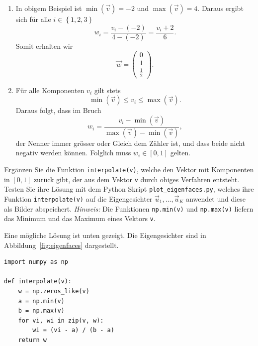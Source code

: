\begin{losung}
	\phantom{text}
	\begin{enumerate}[label=(\alph*)]
		\item In obigem Beispiel ist $\min\left(\vec v\right)=-2$ und $\max\left(\vec v\right)=4$.
		Daraus ergibt sich für alle $i\in\left\{1,2,3\right\}$
		\begin{equation*}
			w_i=\frac{v_i-\left(-2\right)}{4-\left(-2\right)}=\frac{v_i+2}{6}.
		\end{equation*}
		Somit erhalten wir
		\begin{equation*}
			\vec w=
			\begin{pmatrix}
				0 \\
				1 \\
				\tfrac{1}{2}
			\end{pmatrix}.
		\end{equation*}
		\item Für alle Komponenten $v_i$ gilt stets
		\begin{equation*}
			\min\left(\vec v\right)\leq v_i\leq\max\left(\vec v\right).
		\end{equation*}
		Daraus folgt, dass im Bruch
		\begin{equation*}
			w_i=\frac{v_i-\min\left(\vec v\right)}{\max\left(\vec v\right)-\min\left(\vec v\right)},
		\end{equation*}
		der Nenner immer grösser oder Gleich dem Zähler ist, und dass beide nicht negativ werden können.
		Folglich muss $w_i\in\left[0,1\right]$ gelten.
	\end{enumerate}
\end{losung}
\begin{aufgabe} \label{aufg:scaling_code}
	Ergänzen Sie die Funktion \texttt{interpolate(v)}, welche den Vektor mit Komponenten in $\left[0,1\right]$ zurück gibt, der aus dem Vektor \texttt{v} durch obiges Verfahren entsteht.
	Testen Sie ihre Lösung mit dem Python Skript \texttt{plot\_eigenfaces.py}, welches ihre Funktion \texttt{interpolate(v)} auf die Eigengesichter $\vec u_1,\ldots,\vec u_K$ anwendet und diese als Bilder abspeichert.
	\textit{Hinweis:} Die Funktionen \texttt{np.min(v)} und \texttt{np.max(v)} liefern das Minimum und das Maximum eines Vektors \texttt{v}.
\end{aufgabe}
\begin{losung}
	Eine mögliche Lösung ist unten gezeigt.
	Die Eigengesichter sind in Abbildung~\ref{fig:eigenfaces} dargestellt.
\begin{lstlisting}[style=python]
import numpy as np

def interpolate(v):
	w = np.zeros_like(v)
	a = np.min(v)
	b = np.max(v)
	for vi, wi in zip(v, w):
		wi = (vi - a) / (b - a)
	return w
\end{lstlisting}
\end{losung}

